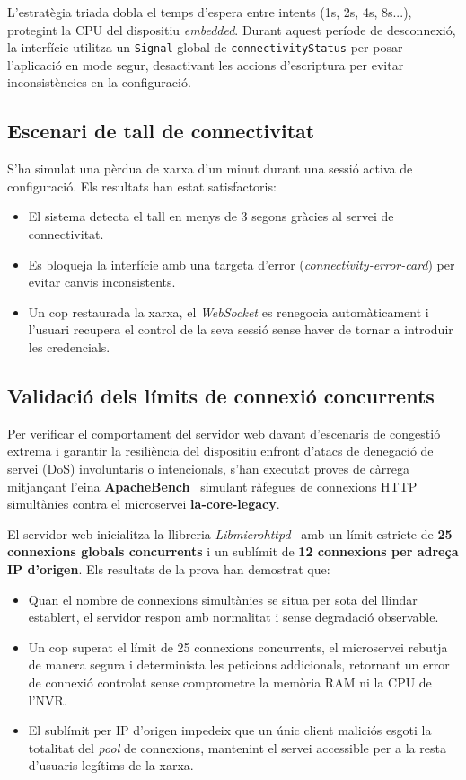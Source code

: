 L'estratègia triada dobla el temps d'espera entre intents (1s, 2s, 4s, 8s...), protegint la CPU del dispositiu \textit{embedded}. Durant aquest període de desconnexió, la interfície utilitza un \texttt{Signal} global de \texttt{connectivityStatus} per posar l'aplicació en mode segur, desactivant les accions d'escriptura per evitar inconsistències en la configuració.

\subsection{Escenari de tall de connectivitat}
S'ha simulat una pèrdua de xarxa d'un minut durant una sessió activa de configuració. Els resultats han estat satisfactoris:
\begin{itemize}
    \item El sistema detecta el tall en menys de 3 segons gràcies al servei de connectivitat.
    \item Es bloqueja la interfície amb una targeta d'error (\textit{connectivity-error-card}) per evitar canvis inconsistents.
    \item Un cop restaurada la xarxa, el \textit{WebSocket} es renegocia automàticament i l'usuari recupera el control de la seva sessió sense haver de tornar a introduir les credencials.
\end{itemize}

\subsection{Validació dels límits de connexió concurrents}
Per verificar el comportament del servidor web davant d'escenaris de congestió extrema i garantir la resiliència del dispositiu enfront d'atacs de denegació de servei (DoS) involuntaris o intencionals, s'han executat proves de càrrega mitjançant l'eina \textbf{ApacheBench}~\cite{apachebench} simulant ràfegues de connexions HTTP simultànies contra el microservei \textbf{la-core-legacy}.

El servidor web inicialitza la llibreria \textit{Libmicrohttpd}~\cite{libmicrohttpd} amb un límit estricte de \textbf{25 connexions globals concurrents} i un sublímit de \textbf{12 connexions per adreça IP d'origen}. Els resultats de la prova han demostrat que:
\begin{itemize}
    \item Quan el nombre de connexions simultànies se situa per sota del llindar establert, el servidor respon amb normalitat i sense degradació observable.
    \item Un cop superat el límit de 25 connexions concurrents, el microservei rebutja de manera segura i determinista les peticions addicionals, retornant un error de connexió controlat sense comprometre la memòria RAM ni la CPU de l'NVR.
    \item El sublímit per IP d'origen impedeix que un únic client maliciós esgoti la totalitat del \textit{pool} de connexions, mantenint el servei accessible per a la resta d'usuaris legítims de la xarxa.
\end{itemize}

